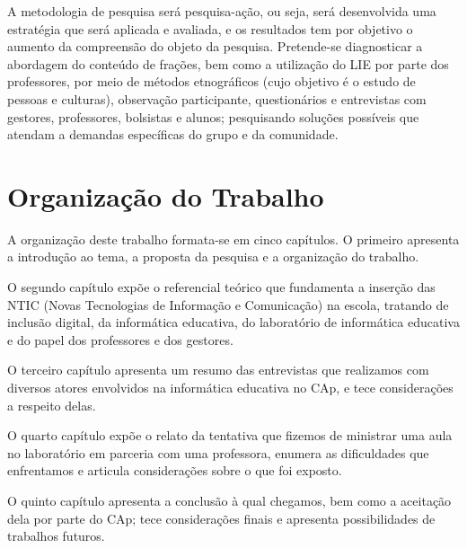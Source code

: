 A metodologia de pesquisa será pesquisa-ação, ou seja, será desenvolvida uma estratégia que será aplicada e avaliada, e os resultados tem por objetivo o aumento da compreensão do objeto da pesquisa. Pretende-se diagnosticar a abordagem do conteúdo de frações, bem como a utilização do LIE por parte dos professores, por meio de métodos etnográficos (cujo objetivo é o estudo de pessoas e culturas), observação participante, questionários e entrevistas com gestores, professores, bolsistas e alunos; pesquisando soluções possíveis que atendam a demandas específicas do grupo e da comunidade.

\section{Organização do Trabalho}\label{chp:LABEL_CHP_INT_SEC_ORG}

A organização deste trabalho formata-se em cinco capítulos. O primeiro apresenta a introdução ao tema, a proposta da pesquisa e a organização do trabalho.

O segundo capítulo expõe o referencial teórico que fundamenta a inserção das NTIC (Novas Tecnologias de Informação e Comunicação) na escola, tratando de inclusão digital, da informática educativa, do laboratório de informática educativa e do papel dos professores e dos gestores.

O terceiro capítulo apresenta um resumo das entrevistas que realizamos com diversos atores envolvidos na informática educativa no CAp, e tece considerações a respeito delas.

O quarto capítulo expõe o relato da tentativa que fizemos de ministrar uma aula no laboratório em parceria com uma professora, enumera as dificuldades que enfrentamos e articula considerações sobre o que foi exposto.

O quinto capítulo apresenta a conclusão à qual chegamos, bem como a aceitação dela por parte do CAp; tece considerações finais e apresenta possibilidades de trabalhos futuros.

